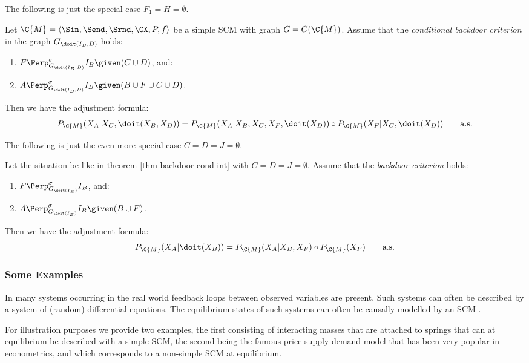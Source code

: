The following is just the special case $F_1=H=\emptyset$.
\begin{Cor}\label{thm:backdoor-cond-int-scms}
  Let $\C{M} = \langle \Sin, \Send, \Srnd, \CX, P, f \rangle$ be a simple SCM with graph $G = G(\C{M})$.
  Assume that the \emph{conditional backdoor criterion} in the graph $G_{\doit(I_B,D)}$ holds:
\begin{enumerate}
    \item $\displaystyle F \Perp^\sigma_{G_{\doit(I_B,D)}} I_B  \given (C \cup D)$, and:
    \item $\displaystyle A \Perp^\sigma_{G_{\doit(I_B,D)}} I_B  \given (B \cup F \cup C \cup D)$.
\end{enumerate}
Then we have the adjustment formula:
\[ P_{\C{M}}(X_A|X_C,\doit(X_B,X_D)) = 
    P_{\C{M}}(X_A|X_B,X_C,X_F,\doit(X_D)) \circ P_{\C{M}}(X_F|X_C,\doit(X_D)) \qquad \text{a.s.}
\]
\end{Cor}
The following is just the even more special case $C=D=J= \emptyset$.
\begin{Cor}\label{thm:backdoor-scms}
    Let the situation be like in theorem \ref{thm-backdoor-cond-int} with $C=D=J= \emptyset$.
    Assume that the \emph{backdoor criterion} holds:
\begin{enumerate}
    \item $\displaystyle F \Perp^\sigma_{G_{\doit(I_B)}} I_B$, and:
    \item $\displaystyle A \Perp^\sigma_{G_{\doit(I_B)}} I_B  \given (B \cup F)$.
\end{enumerate}
Then we have the adjustment formula:
\[ P_{\C{M}}(X_A|\doit(X_B)) = 
    P_{\C{M}}(X_A|X_B,X_F) \circ P_{\C{M}}(X_F) \qquad \text{a.s.}
\]
\end{Cor}

\subsubsection{Some Examples}

In many systems occurring in the real world feedback loops between observed variables are present. 
Such systems can often be described by a system of (random) differential equations. 
The equilibrium states of such systems can often be causally modelled by an SCM \cite{BM18}.

For illustration purposes we provide two examples, the first consisting of interacting masses that are attached to springs
that can at equilibrium be described with a simple SCM, the second being the famous price-supply-demand model that has been
very popular in econometrics, and which corresponds to a non-simple SCM at equilibrium.

